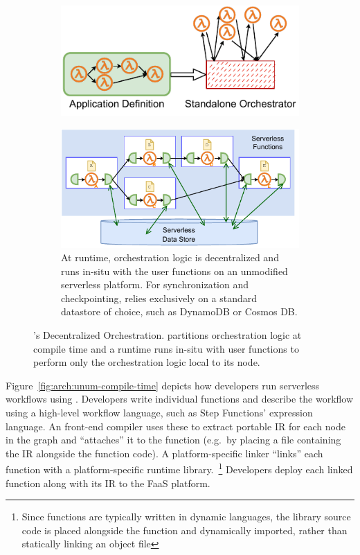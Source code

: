 \begin{figure}[t!]
\begin{subfigure}[t]{0.8\textwidth}
	\end{subfigure}
	\begin{subfigure}[b]{\columnwidth}
		\centering
		\includegraphics[width=0.8\columnwidth]{figures/unum-arch-centralized.pdf}
		\caption{
		\label{fig:arch:centralized}}
	\end{subfigure}
	\hfill
	\begin{subfigure}[b]{\columnwidth}
		\centering
		\includegraphics[width=.7\columnwidth]{figures/unum-arch-runtime.pdf}
		\caption{At runtime, \name{} orchestration logic is decentralized and
			runs in-situ with the user functions on an unmodified serverless
			platform. For synchronization and checkpointing,
			\name{} relies exclusively on a standard datastore of choice, such
			as DynamoDB or Cosmos DB.}
		\label{fig:arch:unum-runtime}
	\end{subfigure}
	\caption{\name{}'s Decentralized Orchestration. \name{} partitions
	orchestration logic at compile time and a \name{} runtime runs in-situ
	with user functions to perform only the orchestration logic local to its
	node.}
	\label{fig:arch}
\end{figure}

Figure~\ref{fig:arch:unum-compile-time} depicts how developers run serverless
workflows using \name{}. Developers write individual functions and describe the
workflow using a high-level workflow language, such as Step Functions'
expression language. An \name{} front-end compiler uses these to extract
portable \name{} IR for each node in the graph and ``attaches'' it to the
function (e.g.\ by placing a file containing the IR alongside the function
code). A platform-specific \name{} linker ``links'' each function with a
platform-specific \name{} runtime library.~\footnote{Since functions are
typically written in dynamic languages, the \name{} library source code is
placed alongside the function and dynamically imported, rather than statically
linking an object file} Developers deploy each linked function along with its IR
to the FaaS platform.

